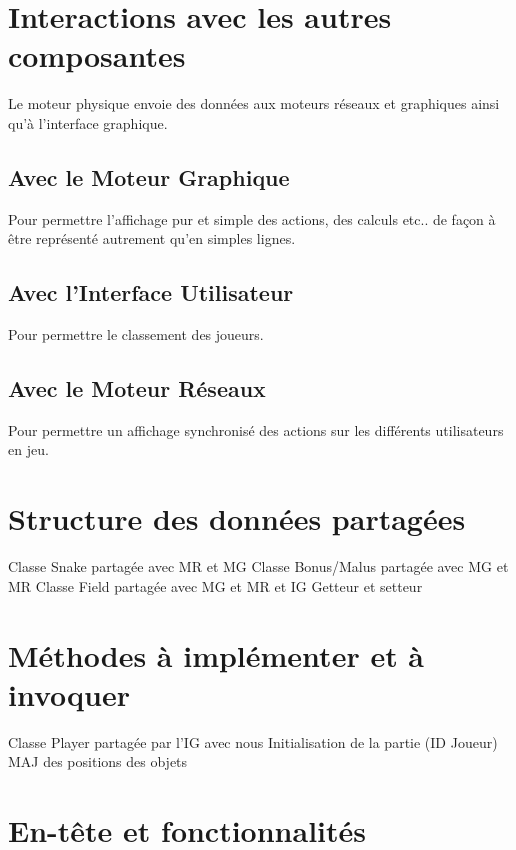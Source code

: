 \documentclass[a4paper,11pt,final]{article}
\begin{document}
\section{Interactions avec les autres composantes}	 
Le moteur physique envoie des données aux moteurs réseaux et graphiques ainsi qu’à l’interface graphique.

\subsection{Avec le Moteur Graphique} 
Pour permettre l’affichage pur et simple des actions, des calculs etc.. de façon à être représenté autrement qu’en simples lignes.

\subsection{Avec l'Interface Utilisateur} 
Pour permettre le classement des joueurs.

\subsection{Avec le Moteur Réseaux} 
Pour permettre un affichage synchronisé des actions sur les différents utilisateurs en jeu.

\section{Structure des données partagées}	  
Classe Snake partagée avec MR et MG
Classe Bonus/Malus partagée avec MG et MR
Classe Field partagée avec MG et MR et IG
Getteur et setteur

\section{Méthodes à implémenter et à invoquer}
Classe Player partagée par l’IG avec nous
Initialisation de la partie (ID Joueur)
MAJ des positions des objets	  

\section{En-tête et fonctionnalités}
\end{document}
